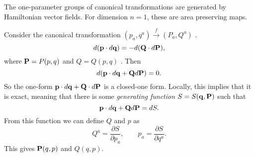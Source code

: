 The one-parameter groups of canonical transformations are generated by Hamiltonian vector fields.
For dimension $n = 1$, these are area preserving maps.

Consider the canonical transformation  $(p_a, q^a) \xrightarrow{f} (P_a, Q^a)$ .
\begin{equation}
  d(\vb{p} \cdot d\vb{q}) = - d(\vb{Q} \cdot d\vb{P}),
\end{equation}
where $\vb{P} = P(p, q)$ and $Q = Q(p, q)$ .
Then
\begin{equation}
  d(\vb{p} \cdot d\vb{q} + \vb{Q} d \vb{P}) = 0.
\end{equation}
So the one-form $\vb{p} \cdot d \vb{q} + \vb{Q} \cdot d\vb{P}$  is a closed-one form. Locally, this implies that it is exact, meaning that there is some \emph{generating function} $S = S(\vb{q}, \vb{P})$  such that
\begin{equation}
  \vb{p} \cdot d \vb{q} + \vb{Q} d \vb{P} = d S.
\end{equation}
From this function we can define $Q$  and $p$ as
 \begin{equation}
  Q^a = \frac{\partial S}{\partial p_a}, \qquad p_a = \frac{\partial S}{\partial q^a}.
\end{equation}
This gives $\vb{P} (q, p)$ and $Q(q, p)$.
